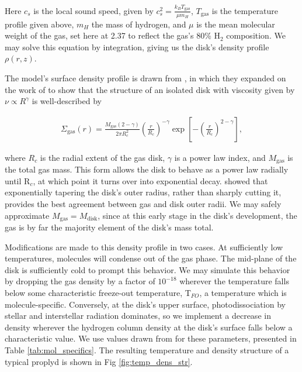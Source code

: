 Here $c_s$ is the local sound speed, given by $c_s^2 = \frac{k_B T_\text{gas}}{\mu m_H}$, $T_\text{gas}$ is the temperature profile given above, $m_H$ the mass of hydrogen, and $\mu$ is the mean molecular weight of the gas, set here at 2.37 to reflect the gas's 80\% H$_2$ composition. We may solve this equation by integration, giving us the disk's density profile $\rho(r, z)$.


The model's surface density profile is drawn from \cite{Hartmann1998}, in which they expanded on the work of \cite{LyndenBell1974} to show that the structure of an isolated disk with viscosity given by $\nu \propto R^\gamma$ is well-described by



\begin{align}
  \Sigma_{\text{gas}}(r) = \frac{M_{\text{gas}} (2 - \gamma)}{2 \pi R_c^2} \left(\frac{r}{R_c} \right)^{-\gamma} \exp \left[-\left(\frac{r}{R_c} \right)^{2-\gamma} \right],
\end{align}


where $R_c$ is the radial extent of the gas disk, $\gamma$ is a power law index, and $M_\text{gas}$ is the total gas mass. This form allows the disk to behave as a power law radially until R$_c$, at which point it turns over into exponential decay. \cite{Hughes2008} showed that exponentially tapering the disk's outer radius, rather than sharply cutting it, provides the best agreement between gas and disk outer radii. We may safely approximate $M_\text{gas} = M_\text{disk}$, since at this early stage in the disk's development, the gas is by far the majority element of the disk's mass total.



Modifications are made to this density profile in two cases. At sufficiently low temperatures, molecules will condense out of the gas phase. The mid-plane of the disk is sufficiently cold to prompt this behavior. We may simulate this behavior by dropping the gas density by a factor of $10^{-18}$ wherever the temperature falls below some characteristic freeze-out temperature, T$_{FO}$, a temperature which is molecule-specific. Conversely, at the disk's upper surface, photodissociation by stellar and interstellar radiation dominates, so we implement a decrease in density wherever the hydrogen column density at the disk's surface falls below a characteristic value. We use values drawn from \cite{Factor2017} for these parameters, presented in Table \ref{tab:mol_specifics}. The resulting temperature and density structure of a typical proplyd is shown in Fig \ref{fig:temp_dens_str}.


